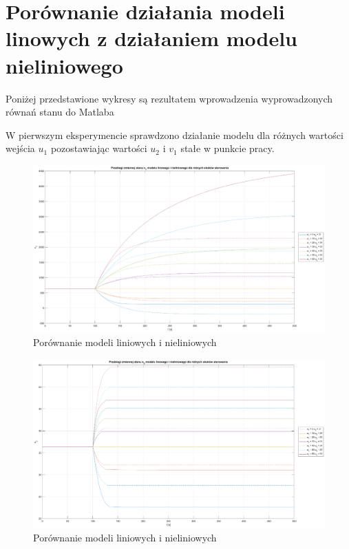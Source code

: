 \section{Porównanie działania modeli linowych z działaniem modelu nieliniowego}

Poniżej przedstawione wykresy są rezultatem wprowadzenia wyprowadzonych równań stanu do Matlaba 


W pierwszym eksperymencie sprawdzono działanie modelu dla różnych wartości wejścia $u_1$ pozostawiając wartości $u_2$ i $v_1$ stałe w punkcie pracy.

\begin{figure}[H]
    \centering
    \includegraphics[scale=0.35]{images/x1_u1=60_u2=31_dt=0.1.eps}
    \caption{Porównanie modeli liniowych i nieliniowych}
\end{figure}

\begin{figure}[H]
    \centering
    \includegraphics[scale=0.35]{images/x2_u1=60_u2=31_dt=0.1.eps}
    \caption{Porównanie modeli liniowych i nieliniowych}
\end{figure}

